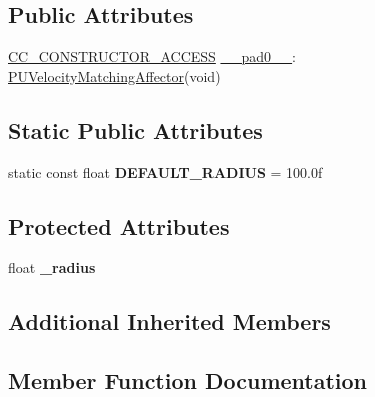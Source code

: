 \subsection*{Public Attributes}
\begin{DoxyCompactItemize}
\item 
\hyperlink{_2cocos2d_2cocos_2base_2ccConfig_8h_a25ef1314f97c35a2ed3d029b0ead6da0}{C\+C\+\_\+\+C\+O\+N\+S\+T\+R\+U\+C\+T\+O\+R\+\_\+\+A\+C\+C\+E\+SS} \hyperlink{classPUVelocityMatchingAffector_aeefb7145690dc14856fce974ffecaa09}{\+\_\+\+\_\+pad0\+\_\+\+\_\+}\+: \hyperlink{classPUVelocityMatchingAffector}{P\+U\+Velocity\+Matching\+Affector}(void)
\end{DoxyCompactItemize}
\subsection*{Static Public Attributes}
\begin{DoxyCompactItemize}
\item 
\mbox{\label{classPUVelocityMatchingAffector_a205ab4076f92a284f4a81ccc9b05d3a7}} 
static const float {\bfseries D\+E\+F\+A\+U\+L\+T\+\_\+\+R\+A\+D\+I\+US} = 100.\+0f
\end{DoxyCompactItemize}
\subsection*{Protected Attributes}
\begin{DoxyCompactItemize}
\item 
\mbox{\label{classPUVelocityMatchingAffector_a8fa2d0a97b3d6b0ab9816997a235ff29}} 
float {\bfseries \+\_\+radius}
\end{DoxyCompactItemize}
\subsection*{Additional Inherited Members}


\subsection{Member Function Documentation}
\mbox{\label{classPUVelocityMatchingAffector_a9742c273ac905446c8019ab2b8be1a87}} 
